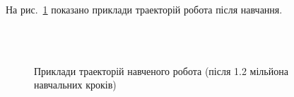 \documentclass[a4paper,10pt,fleqn]{article}
\begin{document}
На рис.~\ref{fig:success-samples} показано приклади траекторій робота після навчання.

\begin{figure}
  \centering
  \,
   \\
  \,
  \caption{Приклади траекторій навченого робота (після 1.2 мільйона навчальних кроків)}
  \label{fig:success-samples}
\end{figure}
\end{document}
